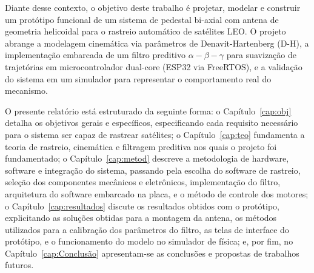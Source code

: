 Diante desse contexto, o objetivo deste trabalho é projetar, modelar e construir um protótipo funcional de um sistema de pedestal bi-axial com antena de geometria helicoidal para o rastreio automático de satélites LEO.
O projeto abrange a modelagem cinemática via parâmetros de Denavit-Hartenberg (D-H), a implementação embarcada de um filtro preditivo $\alpha-\beta-\gamma$ para suavização de trajetórias em microcontrolador dual-core (ESP32 via FreeRTOS), e a validação do sistema em um simulador para representar o comportamento real do mecanismo.

O presente relatório está estruturado da seguinte forma: o Capítulo~\ref{cap:obj} detalha os objetivos gerais e específicos, especificando cada requisito necessário para o sistema ser capaz de rastrear satélites; o Capítulo~\ref{cap:teo} fundamenta a teoria de rastreio, cinemática e filtragem preditiva nos quais o projeto foi fundamentado;
o Capítulo~\ref{cap:metod} descreve a metodologia de hardware, software e integração do sistema, passando pela escolha do software de rastreio, seleção dos componentes mecânicos e eletrônicos, implementação do filtro, arquitetura do software embarcado na placa, e o método de controle dos motores;
o Capítulo~\ref{cap:resultados} discute os resultados obtidos com o protótipo, explicitando as soluções obtidas para a montagem da antena, os métodos utilizados para a calibração dos parâmetros do filtro, as telas de interface do protótipo, e o funcionamento do modelo no simulador de física;
e, por fim, no Capítulo~\ref{cap:Conclusão} apresentam-se as conclusões e propostas de trabalhos futuros.
